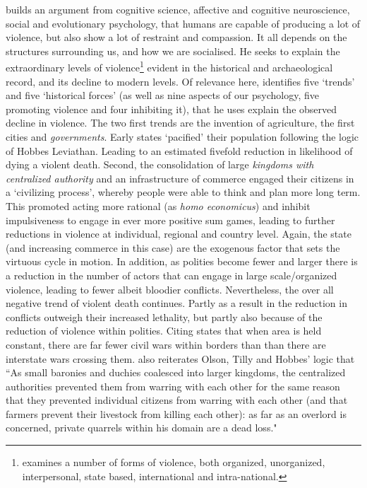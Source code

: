 \documentclass[12pt]{article}
\begin{document}
\begin{multicols}{2}
\citet{Pinker2012} builds an argument from cognitive science, affective and
cognitive neuroscience, social and evolutionary  psychology, that humans are
capable of producing a lot of violence, but also show a lot of restraint and
compassion. It  all depends on the structures surrounding us, and how we are
socialised. He seeks to explain the extraordinary levels of
violence\footnote{\citet{Pinker2012} examines a number of forms of violence,
	both organized, unorganized, interpersonal, state based, international
and intra-national.} evident in the historical and archaeological record, and
its decline to modern levels.  Of relevance here, \citet{Pinker2012} identifies
five `trends' and five `historical forces' (as well as nine aspects of our
psychology, five promoting violence and four inhibiting it), that he uses
explain the observed decline in violence. The two first trends are the invention
of agriculture, the first cities and \textit{governments}. Early states
`pacified' their population following the logic of Hobbes Leviathan.  Leading to
an estimated fivefold reduction in likelihood of dying a violent death. Second,
the consolidation of large \textit{kingdoms with centralized authority} and an
infrastructure of commerce engaged their citizens in a `civilizing process',
whereby people were able to think and plan more long term.  This promoted acting
more rational (as \textit{homo economicus}) and inhibit impulsiveness to engage
in ever more positive sum games, leading to further reductions in violence at
individual, regional and country level. Again, the state (and increasing
commerce in this case) are the exogenous factor that sets the virtuous cycle in
motion. In addition, as polities become fewer and larger there is a reduction in
the number of actors that can engage in large scale/organized violence, leading
to fewer albeit bloodier conflicts. Nevertheless, the over all negative trend of
violent death continues. Partly as a result in the reduction in conflicts
outweigh their increased lethality, but partly also because of the reduction of
violence within polities. Citing \citet{richardson1960statistics}
\citet{Pinker2012} states that when area is held constant, there are far fewer
civil wars within borders than than there are interstate wars crossing them.
\citet{Pinker2012} also reiterates Olson, Tilly and Hobbes' logic that ``As
small baronies and duchies coalesced into larger kingdoms, the centralized
authorities prevented them from warring with each other for the same reason that
they prevented individual citizens from warring with each other (and that
farmers prevent their livestock from killing each other): as far as an overlord
is concerned, private quarrels within his domain are a dead loss."


\end{multicols}
\end{document}
